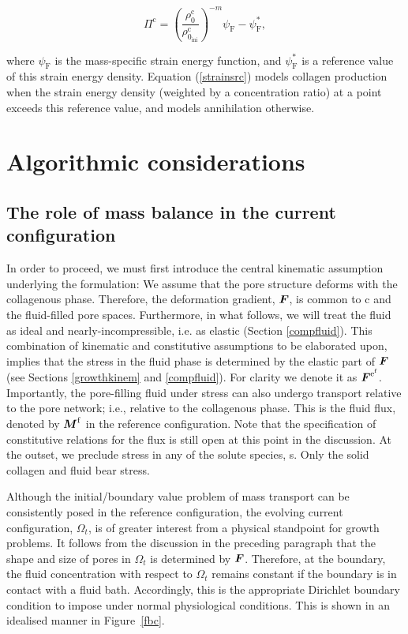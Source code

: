 \begin{equation}
\Pi^\mathrm{c} =
\left(\frac{\rho^\mathrm{c}_0}{\rho^\mathrm{c}_{0_\mathrm{ini}}}\right)^{-m}
\psi_{\mathrm{F}}-\psi_{\mathrm{F}}^*,
\label{strainsrc}
\end{equation}

\noindent where $\psi_{\mathrm{F}}$ is the mass-specific strain energy
function, and $\psi_{\mathrm{F}}^*$ is a reference value of this
strain energy density. Equation (\ref{strainsrc}) models collagen
production when the strain energy density (weighted by a concentration
ratio) at a point exceeds this reference value, and models 
annihilation otherwise.

\section{Algorithmic considerations}
\label{algorithmic-considerations-1}


\subsection{The role of mass balance in the current
  configuration}
\label{role-of-current-mass-balance} 

In order to proceed, we must first introduce the central kinematic
assumption underlying the 
formulation: We assume that the pore structure deforms with the
collagenous phase. Therefore, the deformation gradient, $\mbox{\boldmath$ F$}$, is
common to c and the fluid-filled pore spaces. Furthermore, in what
follows, we will treat the fluid as ideal and nearly-incompressible,
i.e. as elastic (Section \ref{compfluid}). This combination of
kinematic and constitutive assumptions to be elaborated upon, implies
that the stress in the fluid phase is determined by the elastic part of
$\mbox{\boldmath$ F$}$ (see Sections \ref{growthkinem} and
\ref{compfluid}). For clarity we denote it as
$\mbox{\boldmath$ F$}^{\mathrm{e}^\mathrm{f}}$. Importantly, the pore-filling fluid under stress
can also undergo transport relative to the pore network; i.e.,
relative to the collagenous phase. This is the fluid flux, denoted by
$\mbox{\boldmath$ M$}^\mathrm{f}$ in the reference configuration. Note that the
specification of constitutive relations for the flux is still open at
this point in the discussion. At the outset, we preclude stress in any
of the solute species, s. Only the solid collagen and fluid bear
stress. 

Although the initial/boundary value problem of mass transport can be
consistently posed in the reference configuration, the evolving
current configuration, $\Omega_t$, is of greater interest from a
physical standpoint for growth problems. It follows from the
discussion in the preceding paragraph that the shape and size of
pores in $\Omega_t$ is determined by $\mbox{\boldmath$ F$}$. Therefore, at
the boundary, the fluid concentration with 
respect to $\Omega_t$ remains constant if the boundary is in contact
with a fluid bath.  Accordingly, this is the appropriate Dirichlet
boundary condition to impose under normal physiological
conditions. This is shown in an idealised manner in Figure~\ref{fbc}.


